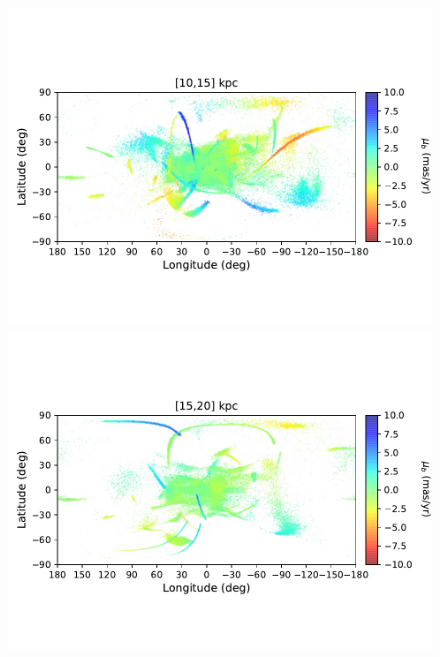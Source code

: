 \begin{figure}[h!]
\begin{center}
            \includegraphics[clip=true, trim = 0mm 20mm 0mm 20mm, width=\columnwidth]{images/PII_ensemble_LB_D10-15_PMB_new.pdf}
            \includegraphics[clip=true, trim = 0mm 20mm 0mm 20mm, width=\columnwidth]{images/PII_ensemble_LB_D15-20_PMB_new.pdf}


\end{center}
\end{figure}
